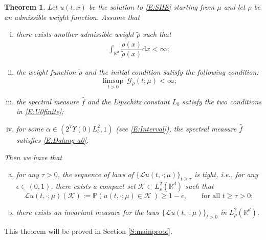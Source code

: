 \documentclass[12pt]{report}
\theoremstyle{plain}
\newtheorem{theorem}{Theorem}[section]
\theoremstyle{definition}
\numberwithin{equation}{section}
\newcommand{\R}{\mathbb{R}}
\newcommand{\ud}{\ensuremath{ \mathrm{d} }}
\begin{document}
\begin{theorem} \label{T:Main}
	Let $u(t,x)$ be the solution to \eqref{E:SHE} starting from $\mu$ and let $\rho$ be an admissible
	weight function. Assume that
	\begin{enumerate}[(i)]
		\item there exists another admissible weight $\tilde{\rho}$ such that
		\begin{align} \label{E:rhorho}
		\int_{\R^d}\dfrac{\rho(x)}{\tilde{\rho}(x)}\ud x < \infty;
		\end{align}
		\item the weight function $\tilde{\rho}$ and the initial condition satisfy the following
		condition:
		\begin{equation} \label{E:InitData}
		\limsup_{t>0}\: \mathcal{G}_{\tilde{\rho}}(t;\mu) < \infty;
		\end{equation}
		\item the spectral measure $\widehat{f}$ and the Lipschitz constant $L_b$ satisfy the two
		conditions in \eqref{E:U0finite};
		\item for some $\alpha\in \left(2^7\Upsilon(0)L_b^2,1\right)$ (see \eqref{E:Interval}), the
		spectral measure $\widehat{f}$ satisfies \eqref{E:Dalang-a0}.
	\end{enumerate}
	Then we have that
	\begin{enumerate}[(a)]
		\item for any $\tau>0$, the sequence of laws of $\{\mathcal{L}u(t,\cdot;\mu)\}_{t\ge \tau}$ is
		tight, i.e., for any $\epsilon \in (0,1)$, there exists a compact set $\mathscr{K}\subset
		L^2_{\rho}(\R^d)$ such that
		\begin{equation} \label{E:cpt}
		\mathcal{L}u(t,\cdot;\mu)(\mathcal{K})
		:=  \mathbb{P}\left( u(t,\cdot;\mu) \in \mathscr{K}\: \right) \ge 1-\epsilon,
		\qquad \text{for all $t\ge \tau>0$};
		\end{equation}
		\item there exists an invariant measure for the laws $\{\mathcal{L}u(t,\cdot;\mu)\}_{t > 0}$ in
		$L^2_\rho(\R^d)$.
	\end{enumerate}
\end{theorem}

This theorem will be proved in Section \ref{S:mainproof}.
\bigskip
\end{document}
